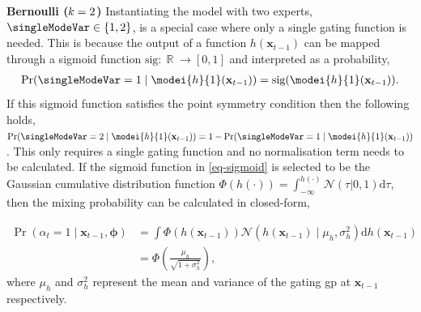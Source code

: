\documentclass{mimosis-class/mimosis}
\numberwithin{equation}{chapter}
\DeclareMathOperator{\R}{\mathbb{R}}
\newcommand{\numData}{\ensuremath{t}}
\newcommand{\modeInd}{\ensuremath{k}}
\newcommand{\ModeInd}{\ensuremath{\MakeUppercase{\modeInd}}}
\newcommand{\singleData}[1]{\ensuremath{#1_{\numData}}}
\newcommand{\x}{\ensuremath{\mathbf{x}}}
\newcommand{\singleInput}{\ensuremath{\x_{\numData-1}}}
\newcommand{\modeVar}{\ensuremath{\alpha}}
\newcommand{\modeVarn}{\ensuremath{\singleData{\modeVar}}}
\newcommand{\gatingFunc}{\ensuremath{h}}
\newcommand{\gatingParams}{\ensuremath{\bm\phi}}
\begin{document}
{\textbf{Bernoulli (\(\ModeInd=2\))} Instantiating the model with two experts, \(\singleModeVar \in \{1, 2\}\), is a special case
where only a single gating function is needed.
This is because the output of a function \(\gatingFunc(\singleInput)\) can be mapped through a sigmoid
function \(\text{sig} : \R \rightarrow [0, 1]\) and interpreted as a probability,
\begin{align} \label{eq-sigmoid}
\Pr(\singleModeVar=1 \mid \modei{\gatingFunc}{1}(\singleInput)) = \text{sig}(\modei{\gatingFunc}{1}(\singleInput)).
\end{align}
If this sigmoid function satisfies the point symmetry condition then
the following holds,
\(\Pr(\singleModeVar=2 \mid \modei{\gatingFunc}{1}(\singleInput)) = 1 - \Pr(\singleModeVar=1 \mid \modei{\gatingFunc}{1}(\singleInput))\).
This only requires a single gating function and no normalisation term needs to be calculated.
If the sigmoid function in \cref{eq-sigmoid} is selected
to be the Gaussian cumulative distribution function
\(\Phi(\gatingFunc(\cdot)) = \int^{\gatingFunc(\cdot)}_{-\infty} \mathcal{N}(\tau | 0, 1) \text{d} \tau\),
then the mixing probability can be calculated in closed-form,

\begin{align} \label{eq-mixing-probabilities-analytic}
\Pr(\modeVarn=1 \mid \singleInput, \gatingParams) &=
 \int \Phi\left(\gatingFunc(\singleInput)\right) \mathcal{N}\left(\gatingFunc(\singleInput) \mid \mu_h, \sigma^2_h \right) \text{d} \gatingFunc(\singleInput) \nonumber \\
&= \Phi \left(\frac{\mu_{h}}{\sqrt{1 + \sigma^2_{h} }}\right),
\end{align}
where \(\mu_h\) and \(\sigma^2_{h}\) represent the mean and variance of the gating \acrshort{gp} at \(\singleInput\) respectively.

}
\end{document}
